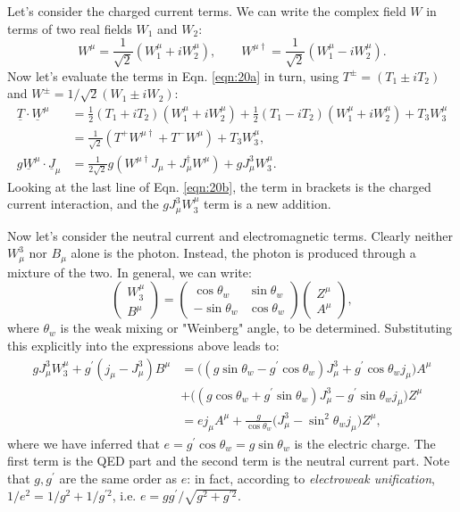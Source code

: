 \documentclass[a4paper,12pt]{article}
\begin{document}
Let's consider the charged current terms. We can write the complex field $W$ in terms of two real fields $W_1$ and $W_2$:
\begin{equation}
W^\mu = \frac{1}{\sqrt{2}} (W_1^\mu + i W_2^\mu), \qquad W^{\mu \dagger} = \frac{1}{\sqrt{2}} (W_1^\mu - i W_2^\mu).
\end{equation}
Now let's evaluate the terms in Eqn. \ref{eqn:20a} in turn, using $T^\pm = (T_1 \pm iT_2)$ and $W^\pm = 1/\sqrt{2}(W_1 \pm iW_2)$:
\begin{equation} \label{eqn:20b}
\begin{split}
\underline{T} \cdot \underline{W}^\mu &= \frac{1}{2} (T_1 + i T_2) (W_1^\mu + i W_2^\mu) + \frac{1}{2} (T_1 - i T_2)(W_1^\mu + i W_2^\mu) + T_3 W_3^\mu \\
&= \frac{1}{\sqrt{2}} (T^+ W^{\mu \dagger} + T^- W^\mu) + T_3 W_3^\mu,\\
g \underline{W}^\mu \cdot \underline{J}_\mu &= \frac{1}{2 \sqrt{2}} g(W^{\mu \dagger} J_\mu + J_\mu^\dagger W^\mu) + gJ_\mu^3 W_3^\mu.
\end{split}
\end{equation}
Looking at the last line of Eqn. \ref{eqn:20b}, the term in brackets is the charged current interaction, and the $gJ_\mu^3 W_3^\mu$ term is a new addition. 

Now let's consider the neutral current and electromagnetic terms. Clearly neither $W_\mu^3$ nor $B_\mu$ alone is the photon. Instead, the photon is produced through a mixture of the two. In general, we can write:
\[\left( \begin{array}{cc}
W^\mu_3 \\
B^\mu 
\end{array} \right) =
 \left( \begin{array}{cc}
\cos\theta_w & \sin\theta_w  \\
-\sin\theta_w & \cos\theta_w  \end{array} \right) 
\left( \begin{array}{cc}
Z^\mu \\
A^\mu 
\end{array} \right), \]
where $\theta_w$ is the weak mixing or "Weinberg" angle, to be determined. Substituting this explicitly into the expressions above leads to:
\begin{equation}
\begin{split}
gJ_\mu^3W_3^\mu + g^\prime(j_\mu - J_\mu^3)B^\mu &= \bigg((g\sin\theta_w - g^\prime \cos\theta_w)J_\mu^3 + g^\prime \cos\theta_wj_\mu\bigg)A^\mu \\
&+ \bigg((g\cos\theta_w + g^\prime \sin\theta_w)J_\mu^3 - g^\prime \sin\theta_w j_\mu\bigg)Z^\mu \\
&= ej_\mu A^\mu + \frac{g}{\cos\theta_w}\bigg(J_\mu^3 - \sin^2\theta_w j_\mu \bigg)Z^\mu,
\end{split}
\end{equation}
where we have inferred that $e = g^\prime \cos\theta_w = g \sin\theta_w$ is the electric charge. The first term is the QED part and the second term is the neutral current part. Note that $g, g^\prime$ are the same order as $e$: in fact, according to \textit{electroweak unification}, $1/e^2 = 1/g^2 + 1/g^{\prime 2}$, i.e. $e = g g^\prime/\sqrt{g^2 + g^{\prime 2}}$.
\end{document}
